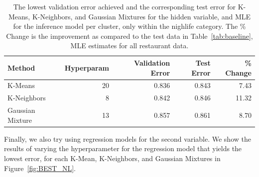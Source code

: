 \documentclass[11pt]{article}
\begin{document}
\begin{table}[h!]
    \begin{tabularx}{0.9\textwidth}{| X | r | r | r | r |}
        \hline
        Method & Hyperparam & Validation Error & Test Error & \% Change\\
        \hline
        K-Means &  20 & 0.836 & 0.843 & 7.43 \\
        K-Neighbors &  8 & 0.842 & 0.846 & 11.32 \\
        Gaussian Mixture & 13 & 0.857 & 0.861 & 8.70 \\
        \hline
    \end{tabularx}
    \caption{The lowest validation error achieved and the corresponding test error for K-Means, K-Neighbors, and Gaussian Mixtures for the hidden variable, and MLE for the inference model per cluster, only within the nighlife category. The \% Change is the improvement as compared to the test data in Table~\ref{tab:baseline}, MLE estimates for all restaurant data.}
    \label{tab:baseline_NL}
\end{table}

Finally, we also try using regression models for the second variable. We show the results of varying the hyperparameter for the regression model that yields the lowest error, for each K-Mean, K-Neighbors, and Gaussian Mixtures in Figure~\ref{fig:BEST_NL}.
\end{document}
